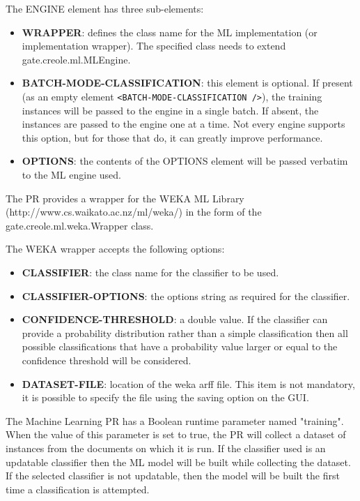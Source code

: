 The ENGINE element has three sub-elements:
\begin{itemize}
\item \textbf{WRAPPER}: defines the class name for the ML
implementation (or implementation wrapper). The specified class needs
to extend gate.creole.ml.MLEngine.

\item \textbf{BATCH-MODE-CLASSIFICATION}: this element is optional.  If present
(as an empty element \verb|<BATCH-MODE-CLASSIFICATION />|), the training
instances will be passed to the engine in a single batch.  If absent, the
instances are passed to the engine one at a time.  Not every engine supports
this option, but for those that do, it can greatly improve performance.

\item \textbf{OPTIONS}: the contents of the OPTIONS element will be
passed verbatim to the ML engine used.
\end{itemize}


The PR provides a wrapper for the WEKA ML Library
(http://www.cs.waikato.ac.nz/ml/weka/) in the form of the
gate.creole.ml.weka.Wrapper class.


The WEKA wrapper accepts the following options:
\begin{itemize}
\item
\textbf{CLASSIFIER}: the class name for the classifier to be used.
\item
\textbf{CLASSIFIER-OPTIONS}: the options string as required for the
classifier.
\item
\textbf{CONFIDENCE-THRESHOLD}: a double value. If the classifier can
provide a probability distribution rather than a simple classification
then all possible classifications that have a probability value larger
or equal to the confidence threshold will be considered.
\item
\textbf{DATASET-FILE}: location of the weka arff file. This item is
not mandatory, it is possible to specify the file using the saving option on the
GUI.
\end{itemize}


The Machine Learning PR has a Boolean runtime parameter named "training". When the
value of this parameter is set to true, the PR will collect a dataset
of instances from the documents on which it is run. If the classifier
used is an updatable classifier then the ML model will be built while
collecting the dataset. If the selected classifier is not updatable,
then the model will be built the first time a classification is
attempted.

